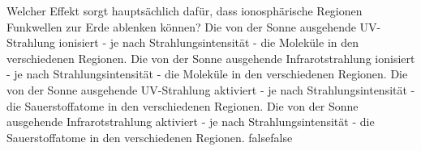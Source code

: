     {Welcher Effekt sorgt hauptsächlich dafür, dass ionosphärische Regionen Funkwellen zur Erde ablenken können?}
    {Die von der Sonne ausgehende UV-Strahlung ionisiert - je nach Strahlungsintensität - die Moleküle in den verschiedenen Regionen.}
    {Die von der Sonne ausgehende Infrarotstrahlung ionisiert - je nach Strahlungsintensität - die Moleküle in den verschiedenen Regionen.}
    {Die von der Sonne ausgehende UV-Strahlung aktiviert - je nach Strahlungsintensität - die Sauerstoffatome in den verschiedenen Regionen.}
    {Die von der Sonne ausgehende Infrarotstrahlung aktiviert - je nach Strahlungsintensität - die Sauerstoffatome in den verschiedenen Regionen.}
    {false}{false}